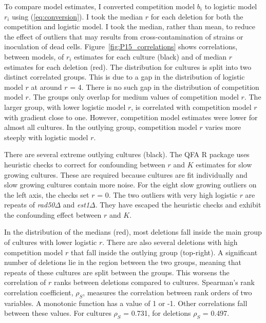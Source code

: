To compare model estimates, I converted competition model \(b_{i}\) to
logistic model \(r_{i}\) using (\ref{eq:conversion}). I took the
median \(r\) for each deletion for both the competition and logistic
model. I took the median, rather than mean, to reduce the effect of
outliers that may results from cross-contamination of strains or
inoculation of dead cells. Figure~\ref{fig:P15_correlations} shows
correlations, between models, of \(r_{i}\) estimates for each culture
(black) and of median \(r\) estimates for each deletion (red). The
distribution for cultures is split into two distinct correlated
groups. This is due to a gap in the distribution of logistic model
\(r\) at around \(r\) = 4. There is no such gap in the distribution of
competition model \(r\). The groups only overlap for medium values of
competition model \(r\). The larger group, with lower logistic model
\(r\), is correlated with competition model \(r\) with gradient close
to one. However, competition model estimates were lower for almost all
cultures. In the outlying group, competition model \(r\) varies more
steeply with logistic model \(r\).

There are several extreme outlying cultures (black). The QFA R package
uses heuristic checks to correct for confounding between \(r\) and
\(K\) estimates for slow growing cultures. These are required because
cultures are fit individually and slow growing cultures contain more
noise. For the eight slow growing outliers on the left axis, the
checks set \(r\) = 0. The two outliers with very high logistic \(r\)
are repeats of \textit{rad50\(\Delta\)} and
\textit{est1\(\Delta\)}. They have escaped the heuristic checks and
exhibit the confounding effect between \(r\) and \(K\).

In the distribution of the medians (red), most deletions fall inside
the main group of cultures with lower logistic \(r\). There are also
several deletions with high competition model \(r\) that fall inside
the outlying group (top-right). A significant number of deletions lie
in the region between the two groups, meaning that repeats of these
cultures are split between the groups. This worsens the correlation of
\(r\) ranks between deletions compared to cultures.  Spearman's rank
correlation coefficient, \(\rho_{S}\), measures the correlation
between rank orders of two variables. A monotonic function has a value
of 1 or -1. Other correlations fall between these values. For cultures
\(\rho_{S}\) = 0.731, for deletions \(\rho_{S}\) =
0.497.

